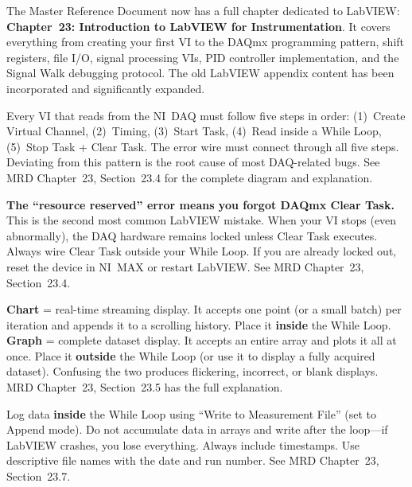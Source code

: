 \documentclass[11pt,letterpaper]{article}
\begin{document}
\begin{faqbox}
The Master Reference Document now has a full chapter dedicated to LabVIEW: \textbf{Chapter~23: Introduction to LabVIEW for Instrumentation}. It covers everything from creating your first VI to the DAQmx programming pattern, shift registers, file I/O, signal processing VIs, PID controller implementation, and the Signal Walk debugging protocol. The old LabVIEW appendix content has been incorporated and significantly expanded.
\end{faqbox}

\begin{faqbox}
Every VI that reads from the NI~DAQ must follow five steps in order: (1)~Create Virtual Channel, (2)~Timing, (3)~Start Task, (4)~Read inside a While Loop, (5)~Stop Task + Clear Task. The error wire must connect through all five steps. Deviating from this pattern is the root cause of most DAQ-related bugs. See MRD Chapter~23, Section~23.4 for the complete diagram and explanation.
\end{faqbox}

\begin{warnbox}
\textbf{The ``resource reserved'' error means you forgot DAQmx Clear Task.} This is the second most common LabVIEW mistake. When your VI stops (even abnormally), the DAQ hardware remains locked unless Clear Task executes. Always wire Clear Task outside your While Loop. If you are already locked out, reset the device in NI~MAX or restart LabVIEW. See MRD Chapter~23, Section~23.4.
\end{warnbox}

\begin{faqbox}
\textbf{Chart} = real-time streaming display. It accepts one point (or a small batch) per iteration and appends it to a scrolling history. Place it \textbf{inside} the While Loop. \textbf{Graph} = complete dataset display. It accepts an entire array and plots it all at once. Place it \textbf{outside} the While Loop (or use it to display a fully acquired dataset). Confusing the two produces flickering, incorrect, or blank displays. MRD Chapter~23, Section~23.5 has the full explanation.
\end{faqbox}

\begin{faqbox}
Log data \textbf{inside} the While Loop using ``Write to Measurement File'' (set to Append mode). Do not accumulate data in arrays and write after the loop---if LabVIEW crashes, you lose everything. Always include timestamps. Use descriptive file names with the date and run number. See MRD Chapter~23, Section~23.7.
\end{faqbox}
\end{document}
